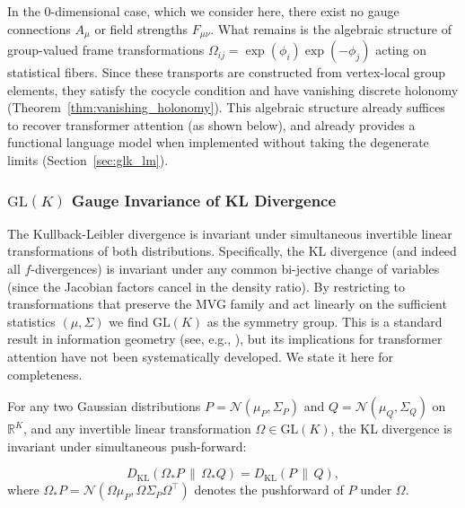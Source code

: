 \documentclass[twoside,11pt]{article}
\begin{document}
In the 0-dimensional case, which we consider here, there exist no gauge connections $A_\mu$ or field strengths $F_{\mu\nu}$. What remains is the algebraic structure of group-valued frame transformations $\Omega_{ij} = \exp(\phi_i)\exp(-\phi_j)$ acting on statistical fibers. Since these transports are constructed from vertex-local group elements, they satisfy the cocycle condition and have vanishing discrete holonomy (Theorem~\ref{thm:vanishing_holonomy}). This algebraic structure already suffices to recover transformer attention (as shown below), and already provides a functional language model when implemented without taking the degenerate limits (Section~\ref{sec:glk_lm}).


\subsubsection{$\mathrm{GL}(K)$ Gauge Invariance of KL Divergence}
\label{sec:glk_invariance}

The Kullback-Leibler divergence is invariant under simultaneous invertible linear transformations of both distributions.  Specifically, the KL divergence (and indeed all $f$-divergences) is invariant under any common bi-jective change of variables (since the Jacobian factors cancel in the density ratio). By restricting to transformations that preserve the MVG family and act linearly on the sufficient statistics $(\mu, \Sigma)$ we find $\mathrm{GL}(K)$ as the symmetry group. This is a standard result in information geometry (see, e.g., \citet{amari2016information}), but its implications for transformer attention have not been systematically developed. We state it here for completeness.

\begin{theorem}
\label{thm:glk_invariance}
For any two Gaussian distributions $P = \mathcal{N}(\mu_P, \Sigma_P)$ and $Q = \mathcal{N}(\mu_Q, \Sigma_Q)$ on $\mathbb{R}^K$, and any invertible linear transformation $\Omega \in \mathrm{GL}(K)$, the KL divergence is invariant under simultaneous push-forward:

\begin{equation}
D_{\mathrm{KL}}(\Omega_* P \,\|\, \Omega_* Q) = D_{\mathrm{KL}}(P \,\|\, Q),
\label{eq:glk_invariance}
\end{equation}
where $\Omega_* P = \mathcal{N}(\Omega\mu_P, \Omega\Sigma_P\Omega^\top)$ denotes the pushforward of $P$ under $\Omega$.
\end{theorem}
\end{document}
